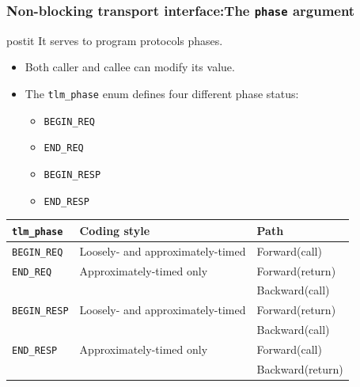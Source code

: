 {\begin{frame}
	\frametitle{Non-blocking transport interface:\newline The \texttt{phase} argument}
	\vspace{0.4em}
	\begin{beamercolorbox}[center,rounded=true,wd=\textwidth]{postit}
		It serves to program protocols phases.
	\end{beamercolorbox}
	\begin{itemize}
		\item<1-> Both caller and callee can modify its value.
		\item The \texttt{tlm\_phase} enum defines four different phase status:
		\begin{itemize}
			\item<1-> \texttt{BEGIN\_REQ}
			\item<1-> \texttt{END\_REQ}
			\item<1-> \texttt{BEGIN\_RESP}
			\item<1-> \texttt{END\_RESP}
		\end{itemize}
	\end{itemize}
	\vspace{-0.9em}
	\begin{center}{
	\scriptsize
	\begin{tabular}{|l|l|l|}
		\hline
		\texttt{\textbf{tlm\_phase}} & \textbf{Coding style} & \textbf{Path} \\
		\hline
		\texttt{BEGIN\_REQ} & Loosely- and approximately-timed & Forward(call) \\
		\hline
		\texttt{END\_REQ} & Approximately-timed only & Forward(return) \\
		& & Backward(call) \\
		\hline
		\texttt{BEGIN\_RESP} & Loosely- and approximately-timed & Forward(return) \\
		& & Backward(call) \\
		\hline
		\texttt{END\_RESP} & Approximately-timed only & Forward(call) \\
		& & Backward(return) \\
		\hline
	\end{tabular}
	}
	\end{center}
\end{frame}

}
